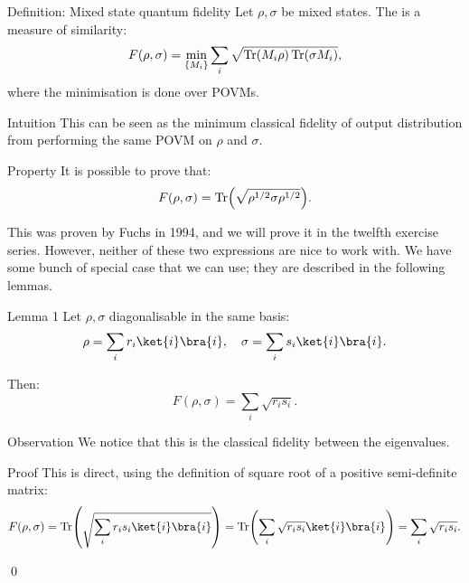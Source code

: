 \documentclass[a4paper]{article}
\begin{document}
\begin{parag}{Definition: Mixed state quantum fidelity}
    Let $\rho, \sigma$ be mixed states. The  is a measure of similarity: 
    \[F\left(\rho, \sigma\right) = \min_{\left\{M_i\right\}} \sum_{i} \sqrt{\Tr\left(M_i \rho\right) \Tr\left(\sigma M_i\right)},\]
    where the minimisation is done over POVMs.

    \begin{subparag}{Intuition}
        This can be seen as the minimum classical fidelity of output distribution from performing the same POVM on $\rho$ and $\sigma$.
    \end{subparag}

    \begin{subparag}{Property}
        It is possible to prove that: 
        \[F\left(\rho, \sigma\right) = \Tr\left(\sqrt{\rho^{1/2} \sigma \rho^{1/2}}\right).\]

        This was proven by Fuchs in 1994, and we will prove it in the twelfth exercise series. However, neither of these two expressions are nice to work with. We have some bunch of special case that we can use; they are described in the following lemmas.
    \end{subparag}
\end{parag}

\begin{parag}{Lemma 1}
    Let $\rho, \sigma$ diagonalisable in the same basis: 
    \[\rho = \sum_{i} r_i \ket{i}\bra{i}, \mathspace \sigma = \sum_{i} s_i \ket{i}\bra{i}.\]
    
    Then: 
    \[F\left(\rho, \sigma\right) = \sum_{i} \sqrt{r_i s_i}.\]

    \begin{subparag}{Observation}
        We notice that this is the classical fidelity between the eigenvalues.
    \end{subparag}
    
    \begin{subparag}{Proof}
        This is direct, using the definition of square root of a positive semi-definite matrix:
        \[F\left(\rho, \sigma\right) = \Tr\left(\sqrt{\sum_{i} r_i s_i \ket{i}\bra{i}}\right) = \Tr\left(\sum_{i} \sqrt{r_i s_i} \ket{i}\bra{i}\right) = \sum_{i} \sqrt{r_i s_i}.\]

        \qed
    \end{subparag}
\end{parag}
\end{document}
